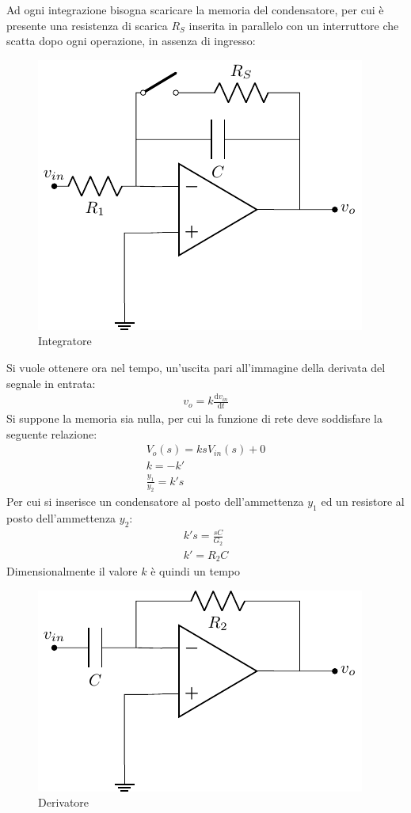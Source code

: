\documentclass{article}
\newcommand{\df}{\mathrm{d}}
\numberwithin{equation}{subsection}
\begin{document}
Ad ogni integrazione bisogna scaricare la memoria del condensatore, per cui è presente una resistenza di scarica $R_S$ inserita in parallelo con un 
interruttore che scatta dopo ogni operazione, in assenza di ingresso:
\begin{figure}[H]%
    \centering
    \includegraphics{amplificatore-integratore.pdf}%
    \caption{Integratore}
    \label{amplificatore-integratore}
\end{figure}    


Si vuole ottenere ora nel tempo, un'uscita pari all'immagine della derivata del segnale in entrata:
\begin{gather*}
    v_{o}=k\displaystyle\frac{\df v_{in}}{\df t}
\end{gather*}
Si suppone la memoria sia nulla, per cui la funzione di rete deve soddisfare la seguente relazione:
\begin{gather*}
    V_o(s)=ksV_{in}(s)+0\\
    k=-k'\\
    \displaystyle\frac{y_1}{y_2}=k's
\end{gather*}
Per cui si inserisce un condensatore al posto dell'ammettenza $y_1$ ed un resistore al posto dell'ammettenza $y_2$:
\begin{gather*}
    k's=\displaystyle\frac{sC}{G_2}\\
    k'=R_2C
\end{gather*}
Dimensionalmente il valore $k$ è quindi un tempo  

\begin{figure}[H]%
    \centering
    \includegraphics{amplificatore-derivatore.pdf}%
    \caption{Derivatore}
    \label{amplificatore-derivatore}
\end{figure}
\end{document}

